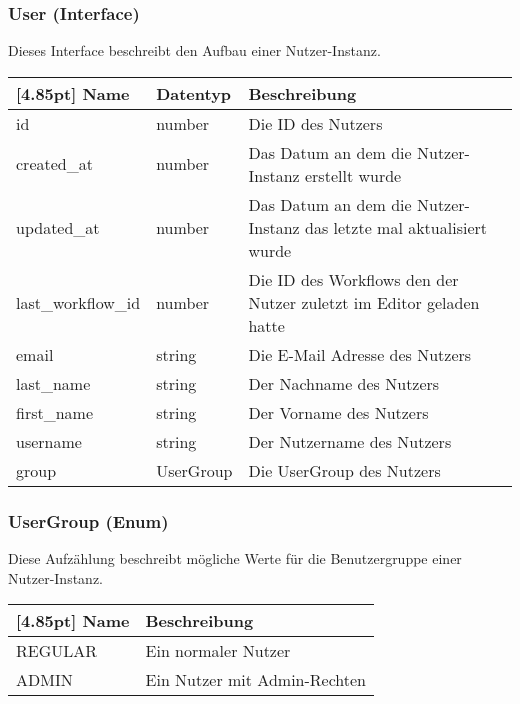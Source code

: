 			\subsubsection{User (Interface)}
			
			Dieses Interface beschreibt den Aufbau einer Nutzer-Instanz.\newline
			
			\begin{center}
				\renewcommand{\arraystretch}{1.5}
				\setlength\tabcolsep{5pt}
				\begin{tabularx}{\textwidth}{|l|l|X|}
					\hline
					\rowcolor[gray]{0.75}[4.85pt]					
					Name & Datentyp & Beschreibung \\ \hline
					id & number & Die ID des Nutzers \\ \hline
					created\_at & number & Das Datum an dem die Nutzer-Instanz erstellt wurde \\ \hline
					updated\_at & number & Das Datum an dem die Nutzer-Instanz das letzte mal aktualisiert wurde\\ \hline
					last\_workflow\_id & number & Die ID des Workflows den der Nutzer zuletzt im Editor geladen hatte \\ \hline
					email & string & Die E-Mail Adresse des Nutzers \\ \hline
					last\_name & string & Der Nachname des Nutzers\\ \hline
					first\_name & string & Der Vorname des Nutzers\\ \hline
					username & string & Der Nutzername des Nutzers\\ \hline
					group & UserGroup & Die UserGroup des Nutzers\\ \hline			
				\end{tabularx}
			\end{center}
				
			\subsubsection{UserGroup (Enum)}
			
			Diese Aufzählung beschreibt mögliche Werte für die Benutzergruppe einer Nutzer-Instanz.\newline
			
			\begin{center}
				\renewcommand{\arraystretch}{1.5}
				\setlength\tabcolsep{5pt}
				\begin{tabularx}{\textwidth}{|l|X|}
					\hline
					\rowcolor[gray]{0.75}[4.85pt]
					Name & Beschreibung \\ \hline
					REGULAR & Ein normaler Nutzer \\ \hline
					ADMIN & Ein Nutzer mit Admin-Rechten \\ \hline
				\end{tabularx}
			\end{center}
	
